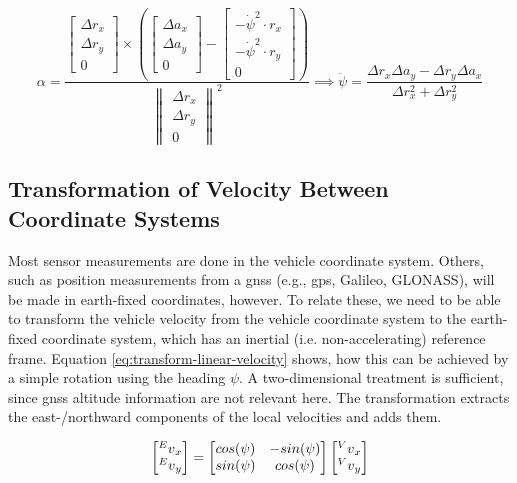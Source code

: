 \begin{equation}\label{eq:angacc-from-linacc-2d}%
\alpha%
= \frac{\begin{bmatrix}\Delta r_x \\ \Delta r_y \\ 0\end{bmatrix} \times \left(\begin{bmatrix}\Delta a_x \\ \Delta a_y \\ 0\end{bmatrix} - \begin{bmatrix}-\dot{\psi}^2 \cdot r_x \\ -\dot{\psi}^2 \cdot r_y \\ 0\end{bmatrix}\right)}{\begin{Vmatrix}\Delta r_x \\ \Delta r_y \\ 0\end{Vmatrix}^2}%
\implies \ddot{\psi} = \frac{\Delta r_x\Delta a_y - \Delta r_y\Delta a_x}{\Delta r_x^2 + \Delta r_y^2}%
\end{equation}


\subsection{Transformation of Velocity Between Coordinate Systems}\label{sec:background-transform-linvelocity}
Most sensor measurements are done in the vehicle coordinate system. Others, such as position measurements from a \gls{gnss} (e.g., \gls{gps}, Galileo, GLONASS), will be made in earth-fixed coordinates, however. To relate these, we need to be able to transform the vehicle velocity from the vehicle coordinate system to the earth-fixed coordinate system, which has an inertial (i.e. non-accelerating) reference frame. Equation \ref{eq:transform-linear-velocity} shows, how this can be achieved by a simple rotation using the heading $\psi$. A two-dimensional treatment is sufficient, since \gls{gnss} altitude information are not relevant here. The transformation extracts the east-/northward components of the local velocities and adds them.

\begin{equation}\label{eq:transform-linear-velocity}%
\begin{bmatrix}\prescript{E}{}{v}_x \\ \prescript{E}{}{v}_y\end{bmatrix}%
=\begin{bmatrix}cos(\psi) & -sin(\psi) \\ sin(\psi) & cos(\psi)\end{bmatrix}%
\begin{bmatrix}\prescript{V}{}{v}_x \\ \prescript{V}{}{v}_y\end{bmatrix}%
\end{equation}



